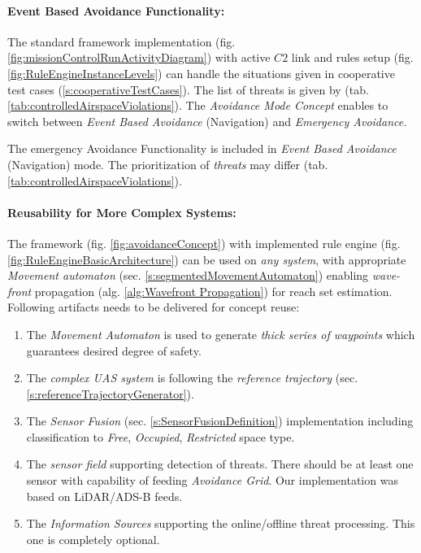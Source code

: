 \paragraph{Event Based Avoidance Functionality:} The standard framework implementation (fig. \ref{fig:missionControlRunActivityDiagram}) with active $C2$ link and rules setup (fig. \ref{fig:RuleEngineInstanceLevels}) can handle the situations given in cooperative test cases (\ref{s:cooperativeTestCases}). The list of threats is given by (tab. \ref{tab:controlledAirspaceViolations}). The \emph{Avoidance Mode Concept} enables to switch between \emph{Event Based Avoidance} (Navigation) and \emph{Emergency Avoidance.}
\begin{note}
    The emergency Avoidance Functionality is included in \emph{Event Based Avoidance} (Navigation) mode.
    The prioritization of \emph{threats} may differ (tab. \ref{tab:controlledAirspaceViolations}).
\end{note}

\paragraph{Reusability for More Complex Systems:} The framework (fig. \ref{fig:avoidanceConcept}) with implemented rule engine (fig. \ref{fig:RuleEngineBasicArchitecture}) can be used on \emph{any system}, with appropriate \emph{Movement automaton} (sec. \ref{s:segmentedMovementAutomaton}) enabling \emph{wave-front} propagation (alg. \ref{alg:Wavefront Propagation}) for reach set estimation. Following artifacts needs to be delivered for concept reuse:

\begin{enumerate}
    \item The \emph{Movement Automaton} is used to generate \emph{thick series of waypoints} which guarantees desired degree of safety.
    
    \item The \emph{complex UAS system} is following the \emph{reference trajectory} (sec. \ref{s:referenceTrajectoryGenerator}).
    
    \item The \emph{Sensor Fusion} (sec. \ref{s:SensorFusionDefinition}) implementation including classification to \emph{Free}, \emph{Occupied}, \emph{Restricted} space type.
    
    \item The \emph{sensor field} supporting detection of threats. There should be at least one sensor with capability of feeding \emph{Avoidance Grid}. Our implementation was based on LiDAR/ADS-B feeds.
    
    \item The \emph{Information Sources} supporting the online/offline threat processing. This one is completely optional.
\end{enumerate}

